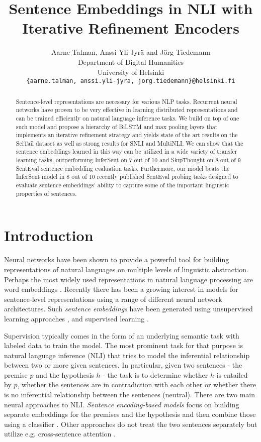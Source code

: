 \documentclass{nle}
\title[Sentence Embeddings in NLI with Iterative Refinement Encoders]
      {Sentence Embeddings in NLI with Iterative Refinement Encoders}
\author[Talman, Yli-Jyr\"a and Tiedemann]
       {Aarne Talman, Anssi Yli-Jyr\"a and  J\"org Tiedemann\\
       Department of Digital Humanities\\University of Helsinki \\
{\tt \{aarne.talman, anssi.yli-jyra, jorg.tiedemann\}@helsinki.fi}}
\begin{document}
\label{firstpage}
\maketitle

\begin{abstract}

Sentence-level representations are necessary for various NLP tasks. Recurrent neural networks have proven to be very effective in learning distributed representations and can be trained efficiently on natural language inference tasks. We build on top of one such model and propose a hierarchy of BiLSTM and max pooling layers that implements an iterative refinement strategy and yields state of the art results on the SciTail dataset as well as strong results for SNLI and MultiNLI. We can show that the sentence embeddings learned in this way can be utilized in a wide variety of transfer learning tasks, outperforming InferSent on 7 out of 10 and SkipThought on 8 out of 9 SentEval sentence embedding evaluation tasks. Furthermore, our model beats the InferSent model in 8 out of 10 recently published SentEval probing tasks designed to evaluate sentence embeddings' ability to capture some of the important linguistic properties of sentences.
\end{abstract}

\section{Introduction}

Neural networks have been shown to provide a powerful tool for building representations of natural languages on multiple levels of linguistic abstraction.  Perhaps the most widely used representations in natural language processing are word embeddings \citep{Mikolov:2013,pennington2014glove}.  Recently there has been a growing interest in models for sentence-level representations using a range of different neural network architectures.  Such {\em sentence embeddings} have been generated using unsupervised learning approaches \citep{KirosZSZTUF15,HillCK16}, and supervised learning \citep{BowmanGRGMP16,infersent}.

Supervision typically comes in the form of an underlying semantic task with labeled data to train the model. The most prominent task for that purpose is natural language inference (NLI) that tries to model the inferential relationship between two or more given sentences. In particular, given two sentences - the premise $p$ and the hypothesis $h$ - the task is to determine whether $h$ is entailed by $p$, whether the sentences are in contradiction with each other or whether there is no inferential relationship between the sentences (neutral). There are two main neural approaches to NLI. {\em Sentence encoding-based models} focus on building separate embeddings for the premises and the hypothesis and then combine those using a classifier \citep{snli,BowmanGRGMP16,infersent}. Other approaches do not treat the two sentences separately but utilize e.g. cross-sentence attention \citep{cafe,Chen}.
\end{document}
